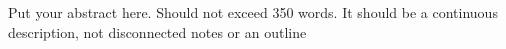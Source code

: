 Put your abstract here. Should not exceed 350 words. It should be a continuous description, not disconnected notes or an outline

\lipsum[1-3]
